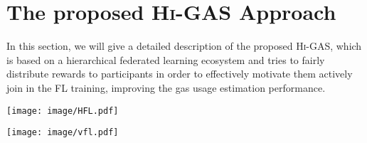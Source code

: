 \documentclass{article}
\newcommand{\methodname}{\textsc{Hi-GAS}}
\begin{document}

\section{The proposed \methodname{} Approach}
In this section, we will give a detailed description of the proposed \methodname{}, which is based on a hierarchical federated learning ecosystem and tries to fairly distribute rewards to participants in order to effectively motivate them actively join in the FL training, improving the gas usage estimation performance. 

\begin{figure*}[t]
\centering
\texttt{[image: image/HFL.pdf]}
\caption{Overview of the incentive model in \methodname{} for the HFL scenario.}
\label{fig:HFL}
\end{figure*}

\begin{figure*}[t]
\centering
\texttt{[image: image/vfl.pdf]}
\caption{Overview of the incentive model in \methodname{} for the VFL scenarios.}
\label{fig:VFL}
\end{figure*}
\end{document}
